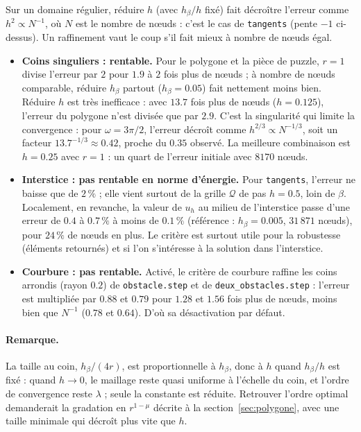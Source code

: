 \documentclass[11pt,a4paper]{article}
\begin{document}
Sur un domaine régulier, réduire $h$ (avec $h_\beta / h$ fixé) fait décroître
l'erreur comme $h^2 \propto N^{-1}$, où $N$ est le nombre de nœuds : c'est le
cas de \texttt{tangents} (pente $-1$ ci-dessus). Un raffinement vaut le coup
s'il fait mieux à nombre de nœuds égal.
\begin{itemize}
  \item \textbf{Coins singuliers : rentable.} Pour le polygone et la pièce de
        puzzle, $r = 1$ divise l'erreur par $2$ pour $1.9$ à $2$ fois plus de
        nœuds ; à nombre de nœuds comparable, réduire $h_\beta$ partout
        ($h_\beta = 0.05$) fait nettement moins bien. Réduire $h$ est très
        inefficace : avec $13.7$ fois plus de nœuds ($h = 0.125$), l'erreur du
        polygone n'est divisée que par $2.9$. C'est la singularité qui limite
        la convergence : pour $\omega = 3\pi/2$, l'erreur décroît comme
        $h^{2/3} \propto N^{-1/3}$, soit un facteur $13.7^{-1/3} \approx 0.42$,
        proche du $0.35$ observé. La meilleure combinaison est $h = 0.25$ avec
        $r = 1$ : un quart de l'erreur initiale avec $8170$ nœuds.
  \item \textbf{Interstice : pas rentable en norme d'énergie.} Pour
        \texttt{tangents}, l'erreur ne baisse que de $2\,\%$ ; elle vient
        surtout de la grille $\mathcal{Q}$ de pas $h = 0.5$, loin de $\beta$.
        Localement, en revanche, la valeur de $u_h$ au milieu de l'interstice
        passe d'une erreur de $0.4$ à $0.7\,\%$ à moins de $0.1\,\%$ (référence :
        $h_\beta = 0.005$, $31\,871$ nœuds), pour $24\,\%$ de nœuds en plus.
        Le critère est surtout utile pour la robustesse (éléments retournés)
        et si l'on s'intéresse à la solution dans l'interstice.
  \item \textbf{Courbure : pas rentable.} Activé, le critère de courbure
        raffine les coins arrondis (rayon $0.2$) de \texttt{obstacle.step}
        et de \texttt{deux\_obstacles.step} : l'erreur est multipliée par
        $0.88$ et $0.79$ pour $1.28$ et $1.56$ fois plus de nœuds, moins bien
        que $N^{-1}$ ($0.78$ et $0.64$). D'où sa désactivation par défaut.
\end{itemize}

\paragraph{Remarque.} La taille au coin, $h_\beta / (4r)$, est
proportionnelle à $h_\beta$, donc à $h$ quand $h_\beta / h$ est fixé : quand
$h \to 0$, le maillage reste quasi uniforme à l'échelle du coin, et l'ordre
de convergence reste $\lambda$ ; seule la constante est réduite. Retrouver
l'ordre optimal demanderait la gradation en $r^{1-\mu}$ décrite à la
section~\ref{sec:polygone}, avec une taille minimale qui décroît plus vite que
$h$.
\end{document}
